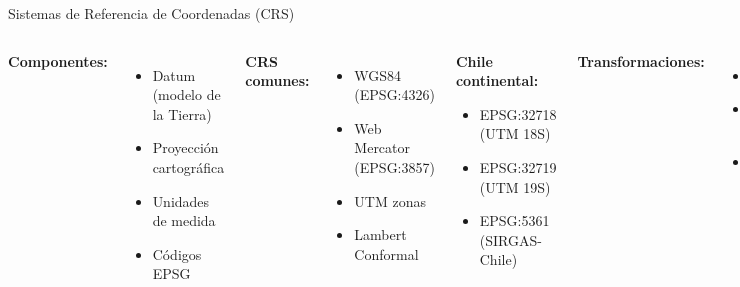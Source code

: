 \documentclass[10pt,aspectratio=169]{beamer}
\begin{document}
\begin{frame}{Sistemas de Referencia de Coordenadas (CRS)}
    \begin{columns}[T]
        \textbf{Componentes:}
        \begin{itemize}
            \item Datum (modelo de la Tierra)
            \item Proyección cartográfica
            \item Unidades de medida
            \item Códigos EPSG
        \end{itemize}
        
        \textbf{CRS comunes:}
        \begin{itemize}
            \item WGS84 (EPSG:4326)
            \item Web Mercator (EPSG:3857)
            \item UTM zonas
            \item Lambert Conformal
        \end{itemize}
        
        \begin{tcolorbox}[colframe=usachred,colback=red!5]
            \footnotesize
            \textbf{Chile continental:}
            \begin{itemize}
                \item EPSG:32718 (UTM 18S)
                \item EPSG:32719 (UTM 19S)
                \item EPSG:5361 (SIRGAS-Chile)
            \end{itemize}
        \end{tcolorbox}
        
        \vspace{0.2cm}
        
        \textbf{Transformaciones:}
        \begin{itemize}
            \item Reproyección
            \item Cambio de datum
            \item Distorsiones inevitables
        \end{itemize}
    \end{columns}
\end{frame}
\end{document}
